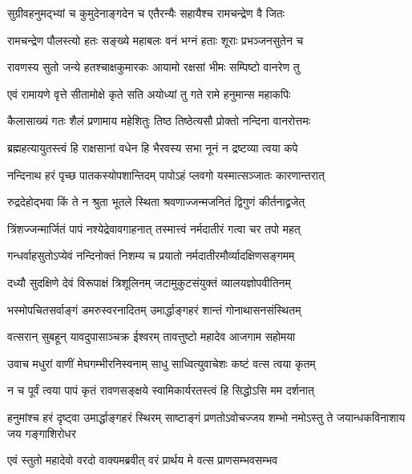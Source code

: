 
\twolineshloka
{सुग्रीवहनुमद्भ्यां च कुमुदेनाङ्गदेन च}
{एतैरन्यैः सहायैश्च रामचन्द्रेण वै जितः}%

\twolineshloka
{रामचन्द्रेण पौलस्त्यो हतः सङ्ख्ये महाबलः}
{वनं भग्नं हताः शूराः प्रभञ्जनसुतेन च}%

\twolineshloka
{रावणस्य सुतो जन्ये हतश्चाक्षकुमारकः}
{आयामो रक्षसां भीमः सम्पिष्टो वानरेण तु}%

\twolineshloka
{एवं रामायणे वृत्ते सीतामोक्षे कृते सति}
{अयोध्यां तु गते रामे हनुमान्स महाकपिः}%

\twolineshloka
{कैलासाख्यं गतः शैलं प्रणामाय महेशितुः}
{तिष्ठ तिष्ठेत्यसौ प्रोक्तो नन्दिना वानरोत्तमः}%

\twolineshloka
{ब्रह्महत्यायुतस्त्वं हि राक्षसानां वधेन हि}
{भैरवस्य सभा नूनं न द्रष्टव्या त्वया कपे}%


\twolineshloka
{नन्दिनाथ हरं पृच्छ पातकस्योपशान्तिदम्}
{पापोऽहं प्लवगो यस्मात्सञ्जातः कारणान्तरात्}%


\twolineshloka
{रुद्रदेहोद्भवा किं ते न श्रुता भूतले स्थिता}
{श्रवणाज्जन्मजनितं द्विगुणं कीर्तनाद्व्रजेत्}%

\twolineshloka
{त्रिंशज्जन्मार्जितं पापं नश्येद्रेवावगाहनात्}
{तस्मात्त्वं नर्मदातीरं गत्वा चर तपो महत्}%

\twolineshloka
{गन्धर्वाहसुतोऽप्येवं नन्दिनोक्तं निशम्य च}
{प्रयातो नर्मदातीरमौर्व्यादक्षिणसङ्गमम्}%

\twolineshloka
{दध्यौ सुदक्षिणे देवं विरूपाक्षं त्रिशूलिनम्}
{जटामुकुटसंयुक्तं व्यालयज्ञोपवीतिनम्}%

\twolineshloka
{भस्मोपचितसर्वाङ्गं डमरुस्वरनादितम्}
{उमार्द्धाङ्गहरं शान्तं गोनाथासनसंस्थितम्}%

\twolineshloka
{वत्सरान् सुबहून् यावदुपासाञ्चक्र ईश्वरम्}
{तावत्तुष्टो महादेव आजगाम सहोमया}%

\twolineshloka
{उवाच मधुरां वाणीं मेघगम्भीरनिस्वनाम्}
{साधु साध्वित्युवाचेशः कष्टं वत्स त्वया कृतम्}%

\twolineshloka
{न च पूर्वं त्वया पापं कृतं रावणसङ्क्षये}
{स्वामिकार्यरतस्त्वं हि सिद्धोऽसि मम दर्शनात्}%

\threelineshloka
{हनुमांश्च हरं दृष्ट्वा उमार्द्धाङ्गहरं स्थिरम्}
{साष्टाङ्गं प्रणतोऽवोचज्जय शम्भो नमोऽस्तु ते}
{जयान्धकविनाशाय जय गङ्गाशिरोधर}%

\twolineshloka
{एवं स्तुतो महादेवो वरदो वाक्यमब्रवीत्}
{वरं प्रार्थय मे वत्स प्राणसम्भवसम्भव}%

